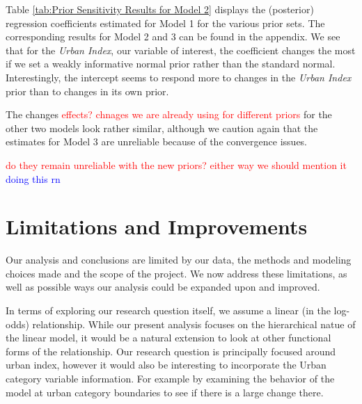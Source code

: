 \documentclass[12pt]{article}
\newcommand{\red}[1]{\textcolor{red}{#1}}
\newcommand{\blue}[1]{\textcolor{blue}{#1}}
\begin{document}
Table \ref{tab:Prior Sensitivity Results for Model 2} displays the (posterior) regression coefficients estimated for Model 1 for the various prior sets. The corresponding results for Model 2 and 3 can be found in the appendix. We see that for the \textit{Urban Index}, our variable of interest, the coefficient changes the most if we set a weakly informative normal prior rather than the standard normal. Interestingly, the intercept seems to respond more to changes in the \textit{Urban Index} prior than to changes in its own prior.

The changes \red{effects? chnages we are already using for different priors} for the other two models look rather similar, although we caution again that the estimates for Model 3 are unreliable because of the convergence issues.

\red{do they remain unreliable with the new priors? either way we should mention it} \blue{doing this rn}






\section{Limitations and Improvements}

Our analysis and conclusions are limited by our data, the methods and modeling choices made and the scope of the project.
We now address these limitations, as well as possible ways our analysis could be expanded upon and improved.


In terms of exploring our research question itself, we assume a linear (in the log-odds) relationship. While our present analysis focuses on the hierarchical natue of the linear model, it would be a natural extension to look at other functional forms of the relationship. Our research question is principally focused around urban index, however it would also be interesting to incorporate the Urban category variable information. For example by examining the behavior of the model at urban category boundaries to see if there is a large change there.
\end{document}
